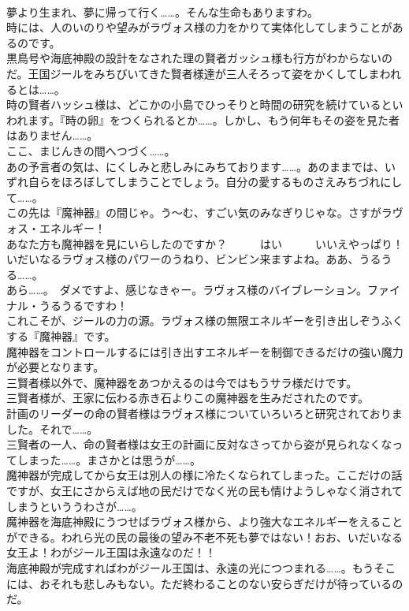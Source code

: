 \documentclass[8pt]{extreport}
\begin{document}
\begin{CJK}{UTF8}{min}
\\	夢より生まれ、夢に帰って行く……。そんな生命もありますわ。	
\\	時には、人のいのりや望みがラヴォス様の力をかりて実体化してしまうことがあるのです。	
\\	黒鳥号や海底神殿の設計をなされた理の賢者ガッシュ様も行方がわからないのだ。王国ジールをみちびいてきた賢者様達が三人そろって姿をかくしてしまわれるとは……。	
\\	時の賢者ハッシュ様は、どこかの小島でひっそりと時間の研究を続けているといわれます。『時の卵』をつくられるとか……。しかし、もう何年もその姿を見た者はありません……。	
\\	ここ、まじんきの間へつづく……。	
\\	あの予言者の気は、にくしみと悲しみにみちております……。あのままでは、いずれ自らをほろぼしてしまうことでしょう。自分の愛するものさえみちづれにして……。	
\\	この先は『魔神器』の間じゃ。う～む、すごい気のみなぎりじゃな。さすがラヴォス・エネルギー！	
\\	あなた方も魔神器を見にいらしたのですか？　　　はい　　　いいえやっぱり！いだいなるラヴォス様のパワーのうねり、ビンビン来ますよね。ああ、うるうる……。	
\\	あら……。　ダメですよ、感じなきゃー。ラヴォス様のバイブレーション。ファイナル・うるうるですわ！	
\\	これこそが、ジールの力の源。ラヴォス様の無限エネルギーを引き出しぞうふくする『魔神器』です。	
\\	魔神器をコントロールするには引き出すエネルギーを制御できるだけの強い魔力が必要となります。	
\\	三賢者様以外で、魔神器をあつかえるのは今ではもうサラ様だけです。	
\\	三賢者様が、王家に伝わる赤き石よりこの魔神器を生みだされたのです。	
\\	計画のリーダーの命の賢者様はラヴォス様についていろいろと研究されておりました。それで……。	
\\	三賢者の一人、命の賢者様は女王の計画に反対なさってから姿が見られなくなってしまった……。まさかとは思うが……。	
\\	魔神器が完成してから女王は別人の様に冷たくなられてしまった。ここだけの話ですが、女王にさからえば地の民だけでなく光の民も情けようしゃなく消されてしまうといううわさが……。	
\\	魔神器を海底神殿にうつせばラヴォス様から、より強大なエネルギーをえることができる。われら光の民の最後の望み不老不死も夢ではない！おお、いだいなる女王よ！わがジール王国は永遠なのだ！！	
\\	海底神殿が完成すればわがジール王国は、永遠の光につつまれる……。もうそこには、おそれも悲しみもない。ただ終わることのない安らぎだけが待っているのだ。	

\end{CJK}
\end{document}
